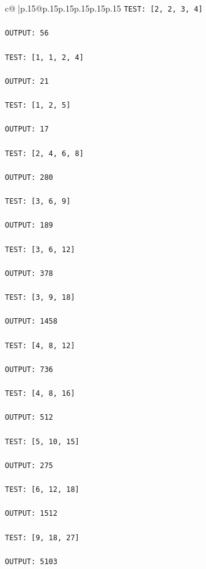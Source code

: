\documentclass{article}
\begin{document}
{\begin{supertabular}{c@{$\;$}|p{.15\linewidth}@{}p{.15\linewidth}p{.15\linewidth}p{.15\linewidth}p{.15\linewidth}p{.15\linewidth}}
{{{\texttt{TEST: {[}2, 2, 3, 4{]}} \\
\\ 
\texttt{OUTPUT: 56} \\
\\ 
\texttt{TEST: {[}1, 1, 2, 4{]}} \\
\\ 
\texttt{OUTPUT: 21} \\
\\ 
\texttt{TEST: {[}1, 2, 5{]}} \\
\\ 
\texttt{OUTPUT: 17} \\
\\ 
\texttt{TEST: {[}2, 4, 6, 8{]}} \\
\\ 
\texttt{OUTPUT: 280} \\
\\ 
\texttt{TEST: {[}3, 6, 9{]}} \\
\\ 
\texttt{OUTPUT: 189} \\
\\ 
\texttt{TEST: {[}3, 6, 12{]}} \\
\\ 
\texttt{OUTPUT: 378} \\
\\ 
\texttt{TEST: {[}3, 9, 18{]}} \\
\\ 
\texttt{OUTPUT: 1458} \\
\\ 
\texttt{TEST: {[}4, 8, 12{]}} \\
\\ 
\texttt{OUTPUT: 736} \\
\\ 
\texttt{TEST: {[}4, 8, 16{]}} \\
\\ 
\texttt{OUTPUT: 512} \\
\\ 
\texttt{TEST: {[}5, 10, 15{]}} \\
\\ 
\texttt{OUTPUT: 275} \\
\\ 
\texttt{TEST: {[}6, 12, 18{]}} \\
\\ 
\texttt{OUTPUT: 1512} \\
\\ 
\texttt{TEST: {[}9, 18, 27{]}} \\
\\ 
\texttt{OUTPUT: 5103} \\
}}}
\end{supertabular}}
\end{document}
